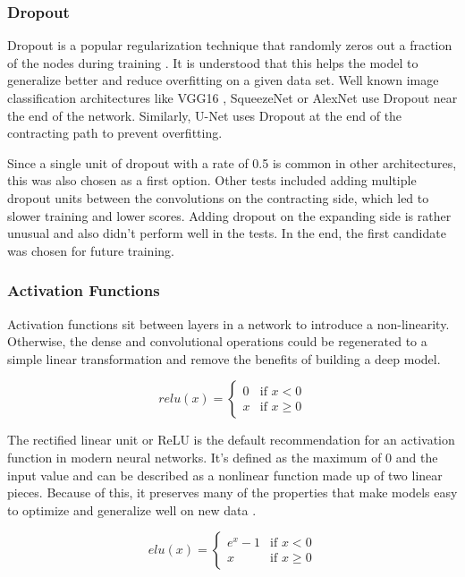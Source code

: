 \subsubsection{Dropout}

Dropout is a popular regularization technique that randomly zeros out a fraction of the nodes during training \cite{Srivastava2014}. It is understood that this helps the model to generalize better and reduce overfitting on a given data set. Well known image classification architectures like VGG16 \cite{Simonyan2014a}, SqueezeNet \cite{Iandola2016a} or AlexNet \cite{Krizhevsky} use Dropout near the end of the network. Similarly, U-Net uses Dropout at the end of the contracting path to prevent overfitting.

Since a single unit of dropout with a rate of 0.5 is common in other architectures, this was also chosen as a first option. Other tests included adding multiple dropout units between the convolutions on the contracting side, which led to slower training and lower scores. Adding dropout on the expanding side is rather unusual and also didn't perform well in the tests. In the end, the first candidate was chosen for future training.

\subsubsection{Activation Functions}

Activation functions sit between layers in a network to introduce a non-linearity. Otherwise, the dense and convolutional operations could be regenerated to a simple linear transformation and remove the benefits of building a deep model.

\[
relu(x) =
\begin{cases} 
0 & \text{if } x < 0  \\
x & \text{if } x \geq 0
\end{cases}
\]

The rectified linear unit or ReLU \cite{Nair} is the default recommendation for an activation function in modern neural networks. It's defined as the maximum of 0 and the input value and can be described as a nonlinear function made up of two linear pieces. Because of this, it preserves many of the properties that make models easy to optimize and generalize well on new data \cite{Goodfellow2016}.

\[
elu(x) =
\begin{cases} 
e^x - 1 & \text{if } x < 0  \\
x & \text{if } x \geq 0
\end{cases}
\]

